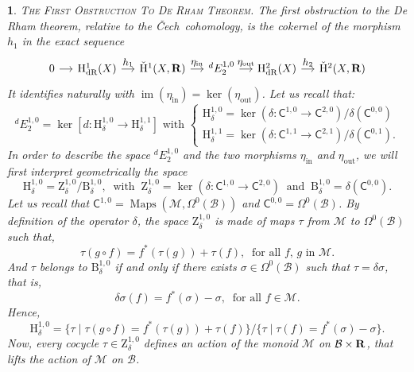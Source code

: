 \documentclass[12pt,reqno]{amsart}
\theoremstyle{article}
\newtheorem{article}{}
\def\artlabel[#1]{\textsc{#1}.}
\newcommand{\xart}[2]{(\text{\textsection} \ref{#1}, #2)}
\def \B{\mathrm B}
\def \H{\mathrm H}
\def \Z{\mathrm Z}
\newcommand{\RR}{{\bf R}}
\newcommand{\cB}{{\mathcal B}}
\newcommand{\cM}{\mathcal{M}}
\newcommand{\sC}{\mathsf{C}}
\newcommand{\Cech}{\v{C}ech\ }
\newcommand{\dR}{\mathrm{dR}}
\newcommand{\exit}{\mathrm{out}}
\newcommand{\init}{\mathrm{in}}
\DeclareMathOperator{\Maps}{Maps}
\DeclareMathOperator{\Val}{im}
\newcommand{\vH}{\check{\mathrm{H}}}
\def \H{\mathrm H}
\begin{document}
  \begin{article}\artlabel[The First Obstruction To De Rham Theorem]
    \label{The-First-Obstruction-To-De-Rham-Theorem}
    The first obstruction to the De Rham theorem,
    relative to the \Cech cohomology,
    is the cokernel of the morphism $h_1$ in the exact sequence
    $$
    \begin{tikzcd}[column sep=1.2em,every label/.append style = {font = \small}]
      0 \arrow[rightarrow]{r} & \H^{1}_\dR(X) \arrow[r, "h_1"] & \vH^{1}(X,\RR) \arrow[r, "\eta_\init"] & {}^dE^{1,0}_2 \arrow[r, "\eta_\exit"] & \H^{2}_\dR(X) \arrow[r, "h_2"]  & \vH^{2}(X,\RR)
    \end{tikzcd}
    $$
    It identifies naturally with $\Val(\eta_\init) = \ker(\eta_\exit)$.
    Let us recall that:
    $$
    {}^dE^{1,0}_2 = \ker[d \colon \H_\delta^{1,0} \to \H_\delta^{1,1}]
    \text{ with }
    \left\{
    \begin{array}{l}
      \H_\delta^{1,0} = \ker(\delta \colon \sC^{1,0} \to \sC^{2,0}) / \delta(\sC^{0,0}) \\[5pt]
      \H_\delta^{1,1} = \ker(\delta \colon \sC^{1,1} \to \sC^{2,1}) / \delta(\sC^{0,1}).
    \end{array}
    \right.
    $$
    In order to describe the space ${}^dE^{1,0}_2$ and the two morphisms $\eta_\init$ and $\eta_\exit$,
    we will first interpret geometrically the space
    $$
    \H_\delta^{1,0} = \Z_\delta^{1,0}/\B_\delta^{1,0},
    \ \text{ with } \
    \Z_\delta^{1,0} = \ker(\delta \colon \sC^{1,0} \to \sC^{2,0})
    \ \text{ and } \
    \B_\delta^{1,0} = \delta(\sC^{0,0}).
    $$
    Let us recall that $\sC^{1,0} = \Maps(\cM,\Omega^0(\cB))$ and $\sC^{0,0}=\Omega^0(\cB)$.
    By definition of the operator $\delta$,
    the space $\Z_\delta^{1,0}$ is made of maps $\tau$ from $\cM$ to $\Omega^0(\cB)$ such that,
    $$
    \tau(g \circ f) = f^*(\tau(g)) + \tau(f),
    \ \text{ for all $f$, $g$ in $\cM$.}
    $$
    And $\tau$ belongs to $\B_\delta^{1,0}$ if and only if there exists $\sigma \in \Omega^0(\cB)$ such that $\tau = \delta\sigma$,
    that is,
    $$
    \delta\sigma(f) = f^*(\sigma) - \sigma,
    \ \text{ for all $f \in \cM$}.
    $$
    Hence,
    $$
    \H_\delta^{1,0} = \{ \tau \mid \tau(g \circ f) = f^*(\tau(g)) + \tau(f) \} /
    \{ \tau \mid \tau(f) = f^*(\sigma) - \sigma \}.
    $$
    Now,
    every cocycle $\tau \in \Z_\delta^{1,0}$ defines an action of the monoid $\cM$ on $\cB \times \RR$,
    that lifts the action of $\cM$ on $\cB$. %

\end{article}
\end{document}

